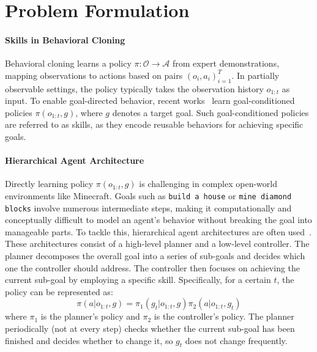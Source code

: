 \section{Problem Formulation}
\label{sec:preliminaries}

\paragraph{Skills in Behavioral Cloning}
Behavioral cloning learns a policy $\pi: \mathcal{O} \rightarrow \mathcal{A}$ from expert demonstrations, mapping observations to actions based on pairs $(o_i, a_i)_{i=1}^T$. In partially observable settings, the policy typically takes the observation history $o_{1:t}$ as input. To enable goal-directed behavior, recent works~\citep{vln-clip,ogn1,traj} learn goal-conditioned policies $\pi(o_{1:t}, g)$, where $g$ denotes a target goal. Such goal-conditioned policies are referred to as skills, as they encode reusable behaviors for achieving specific goals.

\paragraph{Hierarchical Agent Architecture}
Directly learning policy $\pi(o_{1:t}, g)$ is challenging in complex open-world environments like Minecraft. Goals such as \texttt{build a house} or \texttt{mine diamond blocks} involve numerous intermediate steps, making it computationally and conceptually difficult to model an agent's behavior without breaking the goal into manageable parts. To tackle this, hierarchical agent architectures are often used~\citep{voyager,palm-e,rocket-1,alma}. These architectures consist of a high-level planner and a low-level controller. The planner decomposes the overall goal into a series of sub-goals and decides which one the controller should address. The controller then focuses on achieving the current sub-goal by employing a specific skill.
Specifically, for a certain $t$, the policy can be represented as: 
\begin{equation}
    \pi(a|o_{1:t}, g) = \pi_1(g_t|o_{1:t}, g)\pi_2({a|o_{1:t}, g_t})
\end{equation} where $\pi_1$ is the planner's policy and $\pi_2$ is the controller's policy. The planner periodically (not at every step) checks whether the current sub-goal has been finished and decides whether to change it, so $g_t$ does not change frequently. 

